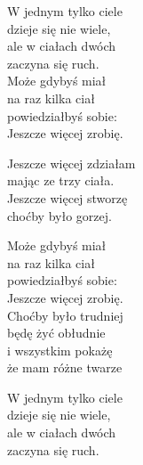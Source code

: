 \begin{text}
    W jednym tylko ciele\\
    dzieje się nie wiele,\\
    ale w ciałach dwóch\\
    zaczyna się ruch.\\
    \vin Może gdybyś miał\\
    \vin na raz kilka ciał\\
    \vin powiedziałbyś sobie:\\
    \vin Jeszcze więcej zrobię.

    \vin Jeszcze więcej zdziałam\\
    \vin mając ze trzy ciała.\\
    \vin Jeszcze więcej stworzę\\
    \vin choćby było gorzej.

    Może gdybyś miał\\
    na raz kilka ciał\\
    powiedziałbyś sobie:\\
    Jeszcze więcej zrobię.\\
    \vin Choćby było trudniej\\
    \vin będę żyć obłudnie\\
    \vin i wszystkim pokażę\\
    \vin że mam różne twarze

    W jednym tylko ciele\\
    dzieje się nie wiele,\\
    ale w ciałach dwóch\\
    zaczyna się ruch.
\end{text}
\begin{chord}

\end{chord}